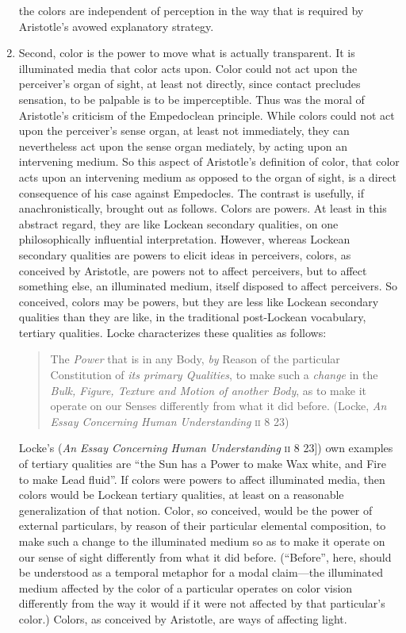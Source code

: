 \begin{enumerate}[(1)]
the colors are independent of perception in the way that is required by Aristotle's avowed explanatory strategy.
	\item Second, color is the power to move what is actually transparent. It is illuminated media that color acts upon. Color could not act upon the perceiver's organ of sight, at least not directly, since contact precludes sensation, to be palpable is to be imperceptible. Thus was the moral of Aristotle's criticism of the Empedoclean principle. While colors could not act upon the perceiver's sense organ, at least not immediately, they can nevertheless act upon the sense organ mediately, by acting upon an intervening medium. So this aspect of Aristotle's definition of color, that color acts upon an intervening medium as opposed to the organ of sight, is a direct consequence of his case against Empedocles. The contrast is usefully, if anachronistically, brought out as follows. Colors are powers. At least in this abstract regard, they are like Lockean secondary qualities, on one philosophically influential interpretation. However, whereas Lockean secondary qualities are powers to elicit ideas in perceivers, colors, as conceived by Aristotle, are powers not to affect perceivers, but to affect something else, an illuminated medium, itself disposed to affect perceivers. So conceived, colors may be powers, but they are less like Lockean secondary qualities than they are like, in the traditional post-Lockean vocabulary, tertiary qualities. Locke characterizes these qualities as follows: 
\begin{quote}
	The \emph{Power} that is in any Body, \emph{by} Reason of the particular Constitution of \emph{its primary Qualities}, to make such a \emph{change} in the \emph{Bulk, Figure, Texture and Motion of another Body}, as to make it operate on our Senses differently from what it did before. (Locke, \emph{An Essay Concerning Human Understanding} \textsc{ii} 8 23)
\end{quote}
Locke's (\emph{An Essay Concerning Human Understanding} \textsc{ii} 8 23]) own examples of tertiary qualities are ``the Sun has a Power to make Wax white, and Fire to make Lead fluid''. If colors were powers to affect illuminated media, then colors would be Lockean tertiary qualities, at least on a reasonable generalization of that notion. Color, so conceived, would be the power of external particulars, by reason of their particular elemental composition, to make such a change to the illuminated medium so as to make it operate on our sense of sight differently from what it did before. (``Before'', here, should be understood as a temporal metaphor for a modal claim---the illuminated medium affected by the color of a particular operates on color vision differently from the way it would if it were not affected by that particular's color.) Colors, as conceived by Aristotle, are ways of affecting light.

\end{enumerate}
